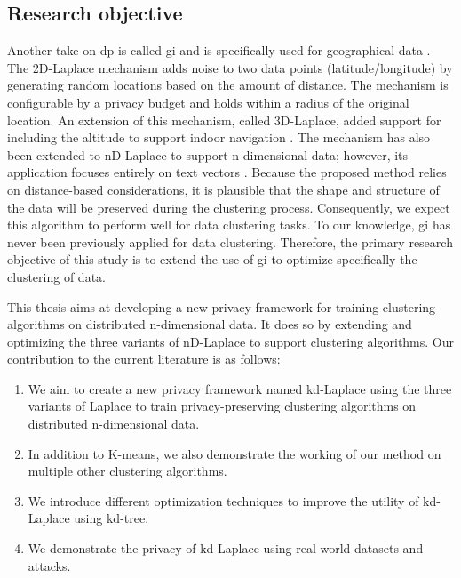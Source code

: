 \subsection*{Research objective}
Another take on \gls{dp} is called \gls{gi} and is specifically used for geographical data  \citep{DBLP:journals/corr/abs-1212-1984}.
The 2D-Laplace mechanism adds noise to two data points (latitude/longitude) by generating random locations based on the amount of distance.
The mechanism is configurable by a privacy budget and holds within a radius of the original location.
An extension of this mechanism, called 3D-Laplace, added support for including the altitude to support indoor navigation \citep{9646489}.
The mechanism has also been extended to nD-Laplace to support n-dimensional data; however, its application focuses entirely on text vectors \citep{fernandes_generalised_2019}. \newline
Because the proposed method relies on distance-based considerations, it is plausible that the shape and structure of the data will be preserved during the clustering process.
Consequently, we expect this algorithm to perform well for data clustering tasks.
To our knowledge, \gls{gi} has never been previously applied for data clustering.
Therefore, the primary research objective of this study is to extend the use of \gls{gi} to optimize specifically the clustering of data. \newline

This thesis aims at developing a new privacy framework for training clustering algorithms on distributed n-dimensional data.
It does so by extending and optimizing the three variants of nD-Laplace to support clustering algorithms.
Our contribution to the current literature is as follows:
\begin{enumerate}
      \item We aim to create a new privacy framework named kd-Laplace using the three variants of Laplace to train privacy-preserving clustering algorithms on distributed n-dimensional data.
      \item In addition to K-means, we also demonstrate the working of our method on multiple other clustering algorithms.
      \item We introduce different optimization techniques to improve the utility of kd-Laplace using kd-tree.
      \item We demonstrate the privacy of kd-Laplace using real-world datasets and attacks.
\end{enumerate}

